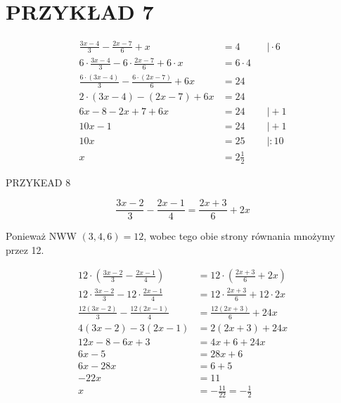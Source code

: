 \documentclass[10pt]{article}
\begin{document}
\section*{PRZYKŁAD 7}
\[
\begin{aligned}
\frac{3 x-4}{3}-\frac{2 x-7}{6}+x & =4 & & \mid \cdot 6 \\
6 \cdot \frac{3 x-4}{3}-6 \cdot \frac{2 x-7}{6}+6 \cdot x & =6 \cdot 4 & & \\
\frac{6 \cdot(3 x-4)}{3}-\frac{6 \cdot(2 x-7)}{6}+6 x & =24 & & \\
2 \cdot(3 x-4)-(2 x-7)+6 x & =24 & & \\
6 x-8-2 x+7+6 x & =24 & & \mid+1 \\
10 x-1 & =24 & & \mid+1 \\
10 x & =25 & & \mid: 10 \\
x & =2 \frac{1}{2} & &
\end{aligned}
\]

PRZYKEAD 8

\[
\frac{3 x-2}{3}-\frac{2 x-1}{4}=\frac{2 x+3}{6}+2 x
\]

Ponieważ NWW \((3,4,6)=12\), wobec tego obie strony równania mnożymy przez 12.

\[
\begin{aligned}
12 \cdot\left(\frac{3 x-2}{3}-\frac{2 x-1}{4}\right) & =12 \cdot\left(\frac{2 x+3}{6}+2 x\right) \\
12 \cdot \frac{3 x-2}{3}-12 \cdot \frac{2 x-1}{4} & =12 \cdot \frac{2 x+3}{6}+12 \cdot 2 x \\
\frac{12(3 x-2)}{3}-\frac{12(2 x-1)}{4} & =\frac{12(2 x+3)}{6}+24 x \\
4(3 x-2)-3(2 x-1) & =2(2 x+3)+24 x \\
12 x-8-6 x+3 & =4 x+6+24 x \\
6 x-5 & =28 x+6 \\
6 x-28 x & =6+5 \\
-22 x & =11 \\
x & =-\frac{11}{22}=-\frac{1}{2}
\end{aligned}
\]
\end{document}
